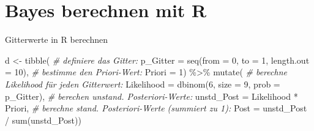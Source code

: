 \documentclass[
  ngerman,
  ignorenonframetext,
]{beamer}
\newenvironment{Shaded}{\begin{snugshade}}{\end{snugshade}}
\newcommand{\AttributeTok}[1]{\textcolor[rgb]{0.77,0.63,0.00}{#1}}
\newcommand{\CommentTok}[1]{\textcolor[rgb]{0.56,0.35,0.01}{\textit{#1}}}
\newcommand{\DecValTok}[1]{\textcolor[rgb]{0.00,0.00,0.81}{#1}}
\newcommand{\FunctionTok}[1]{\textcolor[rgb]{0.00,0.00,0.00}{#1}}
\newcommand{\NormalTok}[1]{#1}
\newcommand{\OtherTok}[1]{\textcolor[rgb]{0.56,0.35,0.01}{#1}}
\newcommand{\SpecialCharTok}[1]{\textcolor[rgb]{0.00,0.00,0.00}{#1}}
\providecommand{\tightlist}{%
  \setlength{\itemsep}{0pt}\setlength{\parskip}{0pt}}
\begin{document}
\hypertarget{bayes-berechnen-mit-r}{%
\section{Bayes berechnen mit R}\label{bayes-berechnen-mit-r}}


\begin{frame}[fragile]{Gitterwerte in R berechnen}
\protect\hypertarget{gitterwerte-in-r-berechnen}{}
\footnotesize

\begin{Shaded}
\begin{Highlighting}[]
\NormalTok{d }\OtherTok{\textless{}{-}}
  \FunctionTok{tibble}\NormalTok{(}
    \CommentTok{\# definiere das Gitter: }
    \AttributeTok{p\_Gitter =} \FunctionTok{seq}\NormalTok{(}\AttributeTok{from =} \DecValTok{0}\NormalTok{, }\AttributeTok{to =} \DecValTok{1}\NormalTok{, }\AttributeTok{length.out =} \DecValTok{10}\NormalTok{),}
    \CommentTok{\# bestimme den Priori{-}Wert:       }
    \AttributeTok{Priori  =} \DecValTok{1}\NormalTok{) }\SpecialCharTok{\%\textgreater{}\%}  
    \FunctionTok{mutate}\NormalTok{(}
      \CommentTok{\# berechne Likelihood für jeden Gitterwert:}
      \AttributeTok{Likelihood =} \FunctionTok{dbinom}\NormalTok{(}\DecValTok{6}\NormalTok{, }\AttributeTok{size =} \DecValTok{9}\NormalTok{, }\AttributeTok{prob =}\NormalTok{ p\_Gitter),}
      \CommentTok{\# berechen unstand. Posteriori{-}Werte:}
      \AttributeTok{unstd\_Post =}\NormalTok{ Likelihood }\SpecialCharTok{*}\NormalTok{ Priori,}
      \CommentTok{\# berechne stand. Posteriori{-}Werte (summiert zu 1):}
      \AttributeTok{Post =}\NormalTok{ unstd\_Post }\SpecialCharTok{/} \FunctionTok{sum}\NormalTok{(unstd\_Post))  }
\end{Highlighting}
\end{Shaded}

\normalsize
\end{frame}
\end{document}
